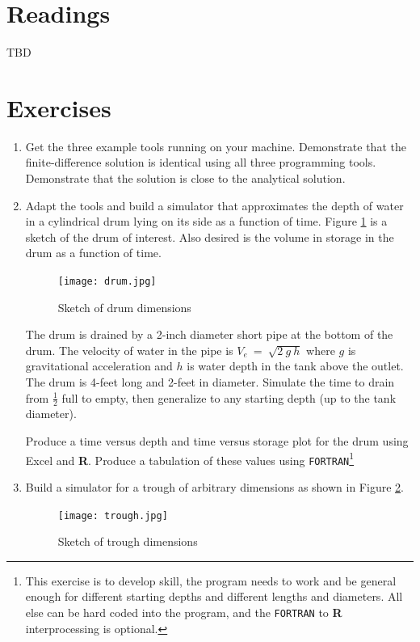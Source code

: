 \documentclass[12pt]{article}
\begin{document}
\section{Readings}
TBD


\section{Exercises}
\begin{enumerate}
\item Get the three example tools running on your machine.  Demonstrate that the finite-difference solution is identical using all three programming tools.  Demonstrate that the solution is close to the analytical solution.
\item Adapt the tools and build a simulator that approximates the depth of water in a cylindrical drum lying on its side as a function of time.  Figure \ref{fig:drum} is a sketch of the drum of interest. Also desired is the volume in storage in the drum as a function of time.

\begin{figure}[h!] %
   \centering
   \texttt{[image: drum.jpg]} 
   \caption{Sketch of drum dimensions}
   \label{fig:drum}
\end{figure}

The drum is drained by a 2-inch diameter short pipe at the bottom of the drum.  The velocity of water in the pipe is $V_e~=~\sqrt{2~g~h}$ where $g$ is gravitational acceleration and $h$ is water depth in the tank above the outlet.  The drum is 4-feet long and 2-feet in diameter.  Simulate the time to drain from $\frac{1}{2}$ full to empty, then generalize to any starting depth (up to the tank diameter).



Produce a time versus depth and time versus storage plot for the drum using Excel and \textbf{R}.  Produce a tabulation of these values using \texttt{FORTRAN}\footnote{This exercise is to develop skill, the program needs to work and be general enough for different starting depths and different lengths and diameters.  All else can be hard coded into the program, and the \texttt{FORTRAN} to \textbf{R} interprocessing is optional.}

\item Build a simulator for a trough of arbitrary dimensions as shown in Figure \ref{fig:trough}.  

\begin{figure}[h!] %
   \centering
   \texttt{[image: trough.jpg]} 
   \caption{Sketch of trough dimensions}
   \label{fig:trough}
\end{figure}


\end{enumerate}
\end{document}
